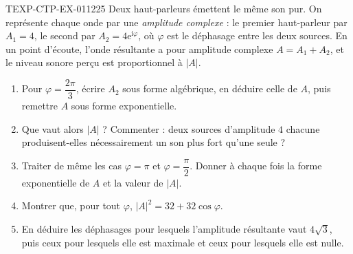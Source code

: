\begin{exercice}{TEXP-CTP-EX-011}{2}{25}
Deux haut-parleurs émettent le même son pur. On représente chaque onde par une
\emph{amplitude complexe} : le premier haut-parleur par $A_1=4$, le second par
$A_2=4\mathrm{e}^{\mathrm{i}\varphi}$, où $\varphi$ est le déphasage entre les
deux sources. En un point d'écoute, l'onde résultante a pour amplitude complexe
$A=A_1+A_2$, et le niveau sonore perçu est proportionnel à $|A|$.
\begin{enumerate}
  \item Pour $\varphi=\dfrac{2\pi}{3}$, écrire $A_2$ sous forme algébrique, en
    déduire celle de $A$, puis remettre $A$ sous forme exponentielle.
  \item Que vaut alors $|A|$ ? Commenter : deux sources d'amplitude $4$ chacune
    produisent-elles nécessairement un son plus fort qu'une seule ?
  \item Traiter de même les cas $\varphi=\pi$ et $\varphi=\dfrac{\pi}{2}$. Donner
    à chaque fois la forme exponentielle de $A$ et la valeur de $|A|$.
  \item Montrer que, pour tout $\varphi$, $|A|^2=32+32\cos\varphi$.
  \item En déduire les déphasages pour lesquels l'amplitude résultante vaut
    $4\sqrt3$, puis ceux pour lesquels elle est maximale et ceux pour lesquels
    elle est nulle.
\end{enumerate}
\end{exercice}
